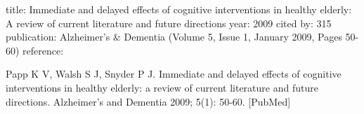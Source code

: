 \documentclass[a4paper]{article}    %
\begin{document}
title: Immediate and delayed effects of cognitive interventions in healthy elderly: A review of current literature and future directions
year: 2009
cited by: 315
publication: Alzheimer's \& Dementia (Volume 5, Issue 1, January 2009, Pages 50-60)
reference:

Papp K V, Walsh S J, Snyder P J. Immediate and delayed effects of cognitive interventions in healthy elderly: a review of current literature and future directions. Alzheimer's and Dementia 2009; 5(1): 50-60. [PubMed]

\end{document}
